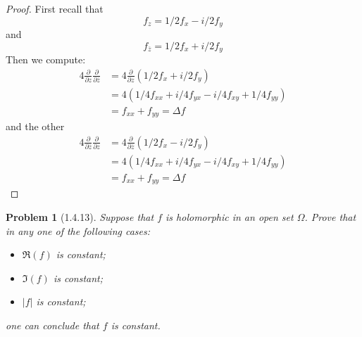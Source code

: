 \documentclass[10pt]{article}
\newcommand{\sk}{\vskip 10mm}
\newcommand{\conj}[1]{\overline{#1}}
\theoremstyle{plain}
\newtheorem{problem}{Problem}
\theoremstyle{remark}
\begin{document}
\begin{proof}
  First recall that
  \[
    f_z=1/2f_x-i/2f_y
  \]
  and
  \[
    f_{\conj{z}}=1/2f_x+i/2f_y
  \]
  Then we compute:
  \begin{align*}
    4\frac{\partial}{\partial z}\frac{\partial}{\partial\conj{z}} &= 4\frac{\partial}{\partial z}(1/2f_x+i/2f_y)\\
                                                           &= 4(1/4f_{xx}+i/4f_{yx}-i/4f_{xy}+1/4f_{yy})\\
                                                           &= f_{xx}+f_{yy} = \Delta f
  \end{align*}
  and the other
  \begin{align*}
    4\frac{\partial}{\partial \conj{z}}\frac{\partial}{\partial z} &= 4\frac{\partial}{\partial \conj{z}}(1/2f_x-i/2f_y)\\
                                                           &= 4(1/4f_{xx}+i/4f_{yx}-i/4f_{xy}+1/4f_{yy})\\
                                                           &= f_{xx}+f_{yy} = \Delta f
  \end{align*}
\end{proof}

\sk

\begin{problem}[1.4.13]
  Suppose that $f$ is holomorphic in an open set $\Omega$. Prove that in any one
  of the following cases:
  \begin{itemize}
  \item[(a)] $\Re(f)$ is constant;
  \item[(b)] $\Im(f)$ is constant;
  \item[(c)] $|f|$ is constant;
  \end{itemize}
  one can conclude that $f$ is constant.
\end{problem}
\end{document}

